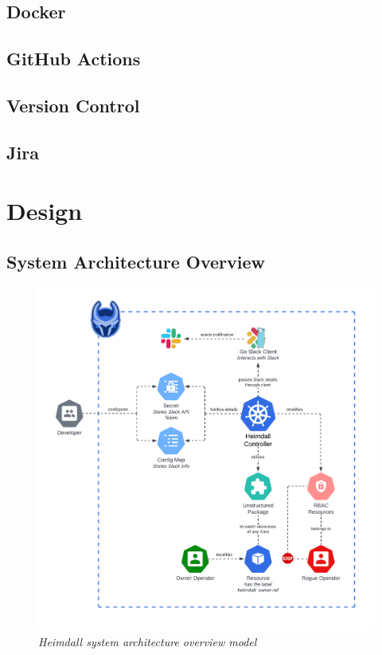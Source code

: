 \documentclass{article}
\begin{document}
\subsection{Docker}
\subsection{GitHub Actions}
\subsection{Version Control}
\subsection{Jira}



\section{Design}


\newpage
\subsection{System Architecture Overview}

\begin{figure}[H]
    \centering
    \includegraphics[width=160mm]{design/arch-diag.png}
    \caption{\emph{Heimdall system architecture overview model}}
    \label{arch-diag}
\end{figure}
\end{document}
